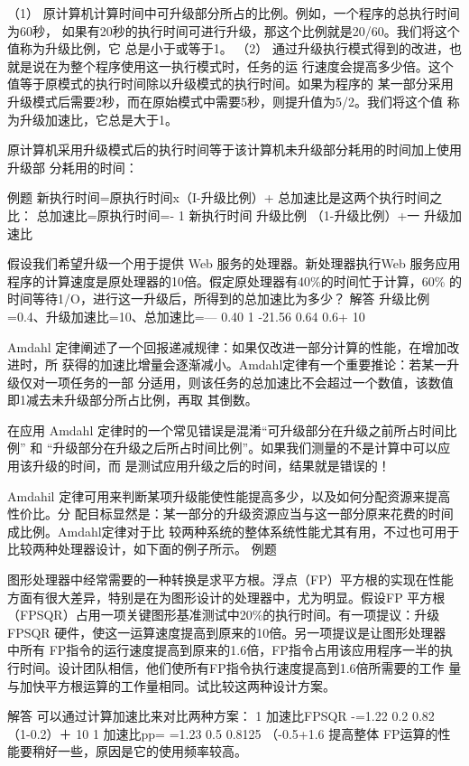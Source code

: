 （1） 原计算机计算时间中可升级部分所占的比例。例如，一个程序的总执行时间为60秒，
如果有20秒的执行时间可进行升级，那这个比例就是20/60。我们将这个值称为升级比例，它
总是小于或等于1。
（2） 通过升级执行模式得到的改进，也就是说在为整个程序使用这一执行模式时，任务的运
行速度会提高多少倍。这个值等于原模式的执行时间除以升级模式的执行时间。如果为程序的
某一部分采用升级模式后需要2秒，而在原始模式中需要5秒，则提升值为5/2。我们将这个值
称为升级加速比，它总是大于1。

原计算机采用升级模式后的执行时间等于该计算机未升级部分耗用的时间加上使用升级部
分耗用的时间：

例题
新执行时间=原执行时间x（I-升级比例）+
总加速比是这两个执行时间之比：
总加速比=原执行时间=-
1
新执行时间
升级比例
（1-升级比例）+一
升级加速比

假设我们希望升级一个用于提供 Web 服务的处理器。新处理器执行Web 服务应用
程序的计算速度是原处理器的10倍。假定原处理器有40\%的时间忙于计算，60\%
的时间等待1/O，进行这一升级后，所得到的总加速比为多少？
解答
升级比例=0.4、升级加速比=10、总加速比=—
0.40
1
-21.56
0.64
0.6+
10

Amdahl 定律阐述了一个回报递减规律：如果仅改进一部分计算的性能，在增加改进时，所
获得的加速比增量会逐渐减小。Amdahl定律有一个重要推论：若某一升级仅对一项任务的一部
分适用，则该任务的总加速比不会超过一个数值，该数值即1减去未升级部分所占比例，再取
其倒数。

在应用 Amdahl 定律时的一个常见错误是混淆“可升级部分在升级之前所占时间比例” 和
“升级部分在升级之后所占时间比例”。如果我们测量的不是计算中可以应用该升级的时间，而
是测试应用升级之后的时间，结果就是错误的！

Amdahil 定律可用来判断某项升级能使性能提高多少，以及如何分配资源来提高性价比。分
配目标显然是：某一部分的升级资源应当与这一部分原来花费的时间成比例。Amdahl定律对于比
较两种系统的整体系统性能尤其有用，不过也可用于比较两种处理器设计，如下面的例子所示。
例题

图形处理器中经常需要的一种转换是求平方根。浮点（FP）平方根的实现在性能
方面有很大差异，特别是在为图形设计的处理器中，尤为明显。假设FP 平方根
（FPSQR）占用一项关键图形基准测试中20\%的执行时间。有一项提议：升级
FPSQR 硬件，使这一运算速度提高到原来的10倍。另一项提议是让图形处理器
中所有 FP指令的运行速度提高到原来的1.6倍，FP指令占用该应用程序一半的执
行时间。设计团队相信，他们使所有FP指令执行速度提高到1.6倍所需要的工作
量与加快平方根运算的工作量相同。试比较这两种设计方案。

解答
可以通过计算加速比来对比两种方案：
1
加速比FPSQR
-=1.22
0.2
0.82
（1-0.2）＋
10
1
加速比pp=
=1.23
0.5
0.8125
（-0.5+1.6
提高整体 FP运算的性能要稍好一些，原因是它的使用频率较高。

